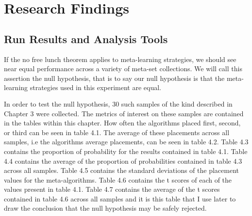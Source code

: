 \chapter{Research Findings}
\label{Chapter4}
\section{Run Results and Analysis Tools}
If the no free lunch theorem applies to  meta-learning strategies, we
should see near equal performance across a variety of meta-set collections.
We will call this assertion the null hypothesis, that is to say our null
hypothesis is that the meta-learning strategies used in this experiment
are equal.

In order to test the null hypothesis, 30 such samples of the kind described
in Chapter 3 were collected. The metrics of interest on these samples are
contained in the tables within this chapter. How often the algorithms placed
first, second, or third can be seen in table 4.1. The average of these
placements across all samples, i.e the algorithms average placements, can be
seen in table 4.2. Table 4.3 contains the proportion of probability for the
results contained in table 4.1. Table 4.4 contains the average of the
proportion of probabilities contained in table 4.3 across all samples.
Table 4.5 contains the standard deviations of the placement values for the
meta-algorithms. Table 4.6 contains the t scores of each of the values present
in table 4.1. Table 4.7 contains the average of the t scores contained in
table 4.6 across all samples and it is this table that I use later to draw the
conclusion that the null hypothesis may be safely rejected.

